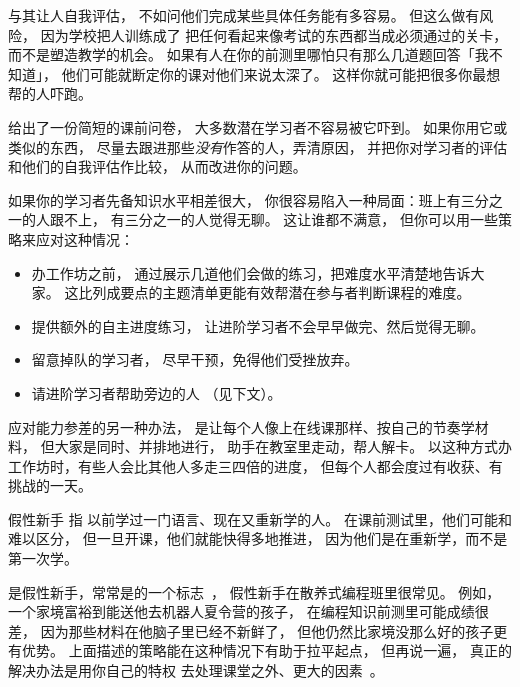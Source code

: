 与其让人自我评估，
不如问他们完成某些具体任务能有多容易。
但这么做有风险，
因为学校把人训练成了
把任何看起来像考试的东西都当成必须通过的关卡，
而不是塑造教学的机会。
如果有人在你的前测里哪怕只有那么几道题回答「我不知道」，
他们可能就断定你的课对他们来说太深了。
这样你就可能把很多你最想帮的人吓跑。

给出了一份简短的课前问卷，
大多数潜在学习者不容易被它吓到。
如果你用它或类似的东西，
尽量去跟进那些\emph{没有}作答的人，弄清原因，
并把你对学习者的评估和他们的自我评估作比较，
从而改进你的问题。


如果你的学习者先备知识水平相差很大，
你很容易陷入一种局面：班上有三分之一的人跟不上，
有三分之一的人觉得无聊。
这让谁都不满意，
但你可以用一些策略来应对这种情况：

\begin{itemize}

\item
  办工作坊之前，
  通过展示几道他们会做的练习，把难度水平清楚地告诉大家。
  这比列成要点的主题清单更能有效帮潜在参与者判断课程的难度。

\item
  提供额外的自主进度练习，
  让进阶学习者不会早早做完、然后觉得无聊。

\item
  留意掉队的学习者，
  尽早干预，免得他们受挫放弃。

\item
  请进阶学习者帮助旁边的人
  （见下文）。

\end{itemize}

应对能力参差的另一种办法，
是让每个人像上在线课那样、按自己的节奏学材料，
但大家是同时、并排地进行，
助手在教室里走动，帮人解卡。
以这种方式办工作坊时，有些人会比其他人多走三四倍的进度，
但每个人都会度过有收获、有挑战的一天。

\begin{aside}{假性新手}
  指
  以前学过一门语言、现在又重新学的人。
  在课前测试里，他们可能和
  难以区分，
  但一旦开课，他们就能快得多地推进，
  因为他们是在重新学，而不是第一次学。

  是假性新手，常常是的一个标志~\cite{Marg2010}，
  假性新手在散养式编程班里很常见。
  例如，
  一个家境富裕到能送他去机器人夏令营的孩子，
  在编程知识前测里可能成绩很差，
  因为那些材料在他脑子里已经不新鲜了，
  但他仍然比家境没那么好的孩子更有优势。
  上面描述的策略能在这种情况下有助于拉平起点，
  但再说一遍，
  真正的解决办法是用你自己的特权
  去处理课堂之外、更大的因素~\cite{Part2011}。
\end{aside}

